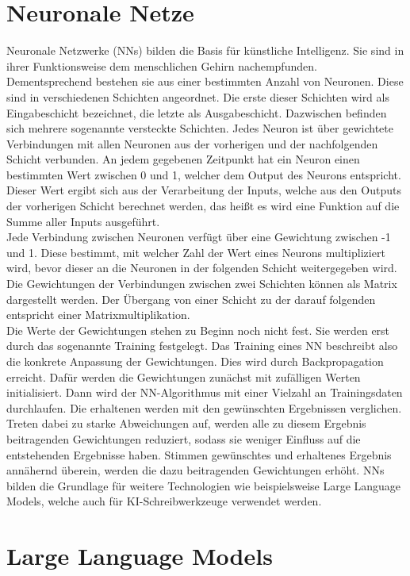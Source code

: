 \documentclass[../main.tex]{subfiles}
\begin{document}
\section{Neuronale Netze}

Neuronale Netzwerke (NNs) bilden die Basis für künstliche Intelligenz. Sie sind in ihrer Funktionsweise dem menschlichen Gehirn nachempfunden. Dementsprechend bestehen sie aus einer 
bestimmten Anzahl von Neuronen. Diese sind in verschiedenen Schichten angeordnet. Die erste dieser Schichten wird als Eingabeschicht bezeichnet, die letzte als Ausgabeschicht. Dazwischen 
befinden sich mehrere sogenannte versteckte Schichten. Jedes Neuron ist über gewichtete Verbindungen mit allen Neuronen aus der vorherigen und der nachfolgenden Schicht verbunden. 
An jedem gegebenen Zeitpunkt hat ein Neuron einen bestimmten Wert zwischen 0 und 1, welcher dem Output des Neurons entspricht. Dieser Wert ergibt sich aus der Verarbeitung der Inputs, welche 
aus den Outputs der vorherigen Schicht berechnet werden, das heißt es wird eine Funktion auf die Summe aller Inputs ausgeführt. \\
Jede Verbindung zwischen Neuronen verfügt über eine Gewichtung zwischen -1 und 1. Diese bestimmt, mit welcher Zahl der Wert eines Neurons multipliziert wird, bevor dieser an die Neuronen in 
der folgenden Schicht weitergegeben wird. Die Gewichtungen der Verbindungen zwischen zwei Schichten können als Matrix dargestellt werden. Der Übergang von einer 
Schicht zu der darauf folgenden entspricht einer Matrixmultiplikation. \\
Die Werte der Gewichtungen stehen zu Beginn noch nicht fest. Sie werden erst durch das sogenannte Training festgelegt. Das Training eines NN beschreibt also die konkrete Anpassung der 
Gewichtungen. Dies wird durch Backpropagation erreicht. Dafür werden die Gewichtungen zunächst mit zufälligen Werten initialisiert. Dann wird der NN-Algorithmus mit einer Vielzahl an 
Trainingsdaten durchlaufen. Die erhaltenen werden mit den gewünschten Ergebnissen verglichen. Treten dabei zu starke Abweichungen auf, werden alle zu diesem Ergebnis beitragenden 
Gewichtungen reduziert, sodass sie weniger Einfluss auf die entstehenden Ergebnisse haben. Stimmen gewünschtes und erhaltenes Ergebnis annähernd überein, werden die dazu beitragenden 
Gewichtungen erhöht. NNs bilden die Grundlage für weitere Technologien wie beispielsweise Large Language Models, welche auch für KI-Schreibwerkzeuge verwendet werden. 

\section{Large Language Models}
\end{document}
